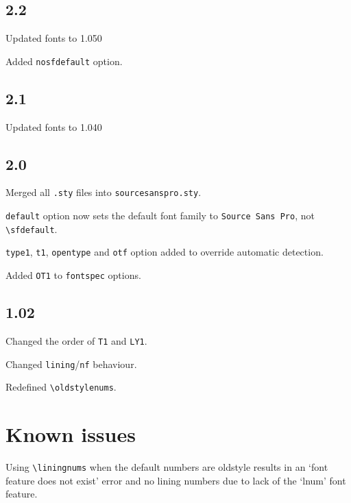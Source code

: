\documentclass[11pt,a4paper,english]{article}
\begin{document}
\begin{multicols}{2}
\subsection*{2.2}
\begin{itemize*}
	\item Updated fonts to 1.050
	\item Added \texttt{nosfdefault} option.
\end{itemize*}

\subsection*{2.1}
\begin{itemize*}
	\item Updated fonts to 1.040
\end{itemize*}

\subsection*{2.0}
\begin{itemize*}
	\item Merged all \texttt{.sty} files into \texttt{sourcesanspro.sty}.
	\item \texttt{default} option now sets the default font family to \texttt{Source Sans Pro}, not \texttt{\textbackslash sfdefault}.
	\item \texttt{type1}, \texttt{t1}, \texttt{opentype} and \texttt{otf} option added to override automatic detection.
	\item Added \texttt{OT1} to \texttt{fontspec} options.
\end{itemize*}

\subsection*{1.02}
\begin{itemize*}
	\item Changed the order of \texttt{T1} and \texttt{LY1}.
	\item Changed \texttt{lining}/\texttt{nf} behaviour.
	\item Redefined \texttt{\textbackslash oldstylenums}.
\end{itemize*}

\section{Known issues}
\begin{itemize*}
	\item Using \texttt{\textbackslash liningnums} when the default numbers are oldstyle results in an ‘font feature does not exist’ error and no lining numbers due to lack of the ‘lnum’ font feature.
\end{itemize*}

\newpage
\end{multicols}
\end{document}
